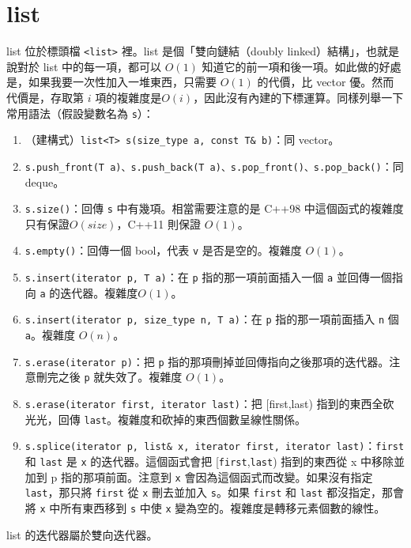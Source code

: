 \documentclass[a4paper, 11pt, oneside]{book}
\begin{document}
\section{list}
list 位於標頭檔 \texttt{<list>} 裡。list 是個「雙向鏈結（doubly linked）結構」，也就是說對於
list 中的每一項，都可以 $O(1)$ 知道它的前一項和後一項。如此做的好處是，如果我要一次性加入一堆東西，只需要 $O(1)$ 的代價，比 vector 優。然而代價是，存取第 $i$ 項的複雜度是$ O(i)$，因此沒有內建的下標運算。同樣列舉一下常用語法（假設變數名為 \texttt{s}）：

\begin{enumerate}
    \item （建構式）\texttt{list<T> s(size\_type a, const T\& b)}：同 vector。
    \item \texttt{s.push\_front(T a)、s.push\_back(T a)、s.pop\_front()、s.pop\_back()}：同 deque。
    \item \texttt{s.size()}：回傳 \texttt{s} 中有幾項。相當需要注意的是 C++98 中這個函式的複雜度只有保證$O(size)$，C++11 則保證 $O(1)$。
    \item \texttt{s.empty()}：回傳一個 bool，代表 \texttt{v} 是否是空的。複雜度 $O(1)$。
    \item \texttt{s.insert(iterator p, T a)}：在 \texttt{p} 指的那一項前面插入一個 \texttt{a} 並回傳一個指向 \texttt{a} 的迭代器。複雜度$O(1)$。
    \item \texttt{s.insert(iterator p, size\_type n, T a)}：在 \texttt{p} 指的那一項前面插入 \texttt{n} 個 \texttt{a}。複雜度 $O(n)$。
    \item \texttt{s.erase(iterator p)}：把 \texttt{p} 指的那項刪掉並回傳指向之後那項的迭代器。注意刪完之後 \texttt{p} 就失效了。複雜度 $O(1)$。
    \item \texttt{s.erase(iterator first, iterator last)}：把 [first,last) 指到的東西全砍光光，回傳 \texttt{last}。複雜度和砍掉的東西個數呈線性關係。
    \item \texttt{s.splice(iterator p, list\& x, iterator first, iterator last)}：\texttt{first} 和 \texttt{last} 是 \texttt{x} 的迭代器。這個函式會把 [\texttt{first},\texttt{last}) 指到的東西從 x 中移除並加到 p 指的那項前面。注意到 \texttt{x} 會因為這個函式而改變。如果沒有指定 \texttt{last}，那只將 \texttt{first} 從 \texttt{x} 刪去並加入 \texttt{s}。如果 \texttt{first} 和 \texttt{last} 都沒指定，那會將 \texttt{x} 中所有東西移到 \texttt{s} 中使 \texttt{x} 變為空的。複雜度是轉移元素個數的線性。
\end{enumerate}

list 的迭代器屬於雙向迭代器。
\end{document}
